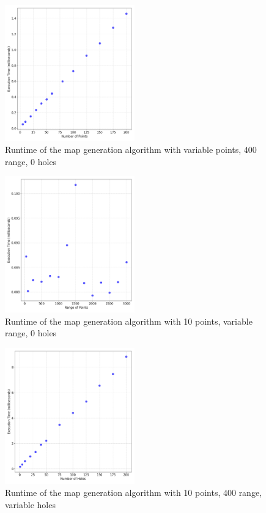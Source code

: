 \documentclass[final]{cmpreport_02}
\begin{document}
\begin{figure}[h!]
	\centering
	\includegraphics[width=0.5\textwidth]{./images/mapGenPointsRT.png}
	\caption{Runtime of the map generation algorithm with variable points, 400 range, 0 holes}
	\label{PE:mg:points}
\end{figure}


\begin{figure}[h!]
	\centering
	\includegraphics[width=0.5\textwidth]{./images/mapGenRangeRT.png}
	\caption{Runtime of the map generation algorithm with 10 points, variable range, 0 holes}

	\label{PE:mg:range}
\end{figure}

\begin{figure}[h!]
	\centering
	\includegraphics[width=0.5\textwidth]{./images/mapGenHolesRT.png}
	\caption{Runtime of the map generation algorithm with 10 points, 400 range, variable holes}
	\label{PE:mg:holes}
\end{figure}
\end{document}
